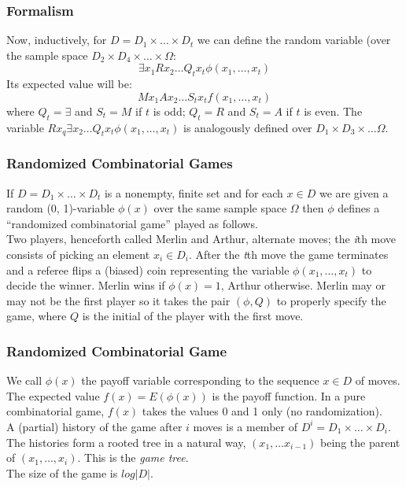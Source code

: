 \documentclass{beamer}
\begin{document}
\begin{frame}
\frametitle{Formalism}
Now, inductively, for $D = D_1 \times \ldots \times D_t$ we can define the random variable (over the sample space $D_2 \times D_4 \times \ldots \times \Omega$: $$\exists x_1 R x_2 \ldots Q_t x_t \phi(x_1, \ldots, x_t)$$
Its expected value will be: $$M x_1 A x_2 \ldots S_t x_t f(x_1, \ldots, x_t)$$
where $Q_t = \exists$ and $S_t = M$ if $t$ is odd; $Q_t = R$ and $S_t = A$ if $t$ is even. The variable $R x_q \exists x_2 \dots Q_t x_t \phi (x_1,\ldots,x_t)$ is analogously defined over $D_1 \times D_3 \times \dots \Omega$.
\end{frame}

\begin{frame}
\frametitle{Randomized Combinatorial Games}
If $D = D_1 \times \ldots \times D_t$ is a nonempty, finite set and for each $x \in D$ we are given a random (0, 1)-variable $\phi(x)$ over the same sample space $\Omega$  then $\phi$ defines a ``randomized combinatorial game'' played as follows.\\
Two players, henceforth called Merlin and Arthur, alternate moves; the \textit{i}th move consists of picking an element $x_i \in D_i$. After the \textit{t}th move the game terminates and a referee flips a (biased) coin representing the variable $\phi(x_1,\ldots,x_t)$ to decide the winner. Merlin wins if $\phi(x) = 1$, Arthur otherwise. Merlin may or may not be the first player so it takes the pair $(\phi, Q)$ to properly specify the game, where $Q$ is the initial of the player with the first move.
\end{frame}

\begin{frame}
\frametitle{Randomized Combinatorial Game}
We call $\phi(x)$ the payoff variable corresponding to the sequence $x \in D$ of moves. The expected value $f(x) = E(\phi(x))$ is the payoff function. In a pure combinatorial game, $f(x)$ takes the values 0 and 1 only (no randomization).\\
A (partial) history of the game after $i$ moves is a member of $D^i = D_1 \times \ldots \times D_i$. The histories form a rooted tree in a natural way, $(x_1, \ldots x_{i-1})$ being the parent of $(x_1,\ldots,x_i)$. This is the \textit{game tree}.\\
The size of the game is $log|D|$.
\end{frame}
\end{document}
